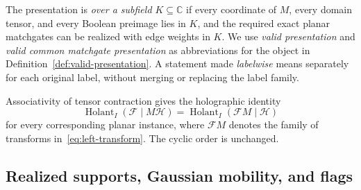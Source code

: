 \documentclass[11pt]{article}
\theoremstyle{definition}
\theoremstyle{remark}
\newcommand{\C}{\mathbb C}
\newcommand{\cF}{\mathcal F}
\newcommand{\cH}{\mathcal H}
\newcommand{\Hol}{\operatorname{Holant}}
\begin{document}
The presentation is \emph{over a subfield $K\subseteq\C$} if every
coordinate of $M$, every domain tensor, and every Boolean preimage lies in
$K$, and the required exact planar matchgates can be realized with edge
weights in $K$.  We use \emph{valid presentation} and \emph{valid common
matchgate presentation} as abbreviations for the object in
Definition~\ref{def:valid-presentation}.  A statement made \emph{labelwise}
means separately for each original label, without merging or replacing the
label family.

Associativity of tensor contraction gives the holographic identity
\begin{equation}
  \Hol_I(\cF\mid M\cH)
  =\Hol_I(\cF M\mid\cH)
  \label{eq:holographic-identity}
\end{equation}
for every corresponding planar instance, where $\cF M$ denotes the family
of transforms in~\eqref{eq:left-transform}.  The cyclic order is unchanged.

\subsection{Realized supports, Gaussian mobility, and flags}
\label{sec:support-terminology}
\end{document}
